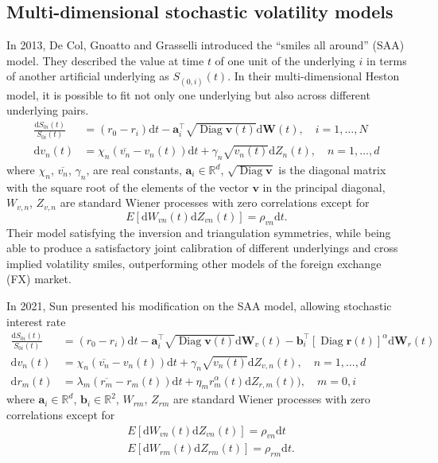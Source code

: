 \documentclass[12pt]{report}
\newcommand{\R}{\mathbb{R}}
\begin{document}
\subsection{Multi-dimensional stochastic volatility models}
In 2013, De Col, Gnoatto and Grasselli \cite{de2013smiles} introduced the ``smiles all around'' (SAA) model.
They described the value at time $t$ of one unit of the underlying $i$ in terms of another artificial underlying as $S_{(0,i)}(t)$. In their multi-dimensional Heston model, it is possible to fit not only one underlying but also across different underlying pairs.
\begin{align}
\frac{\mathrm{d} S_{0i}(t)}{S_{0i}(t)} &=\left(r_{0}-r_{i}\right) \mathrm{d}t-\mathbf{a}_{i}^{\top} \sqrt{\operatorname{Diag}\mathbf{v}(t)} \mathrm{d} \mathbf{W}(t), \quad i=1, \ldots, N \\
\mathrm{d} v_{n}(t)&=\chi_{n}\left(\overline{v_{n}}-v_{n}(t)\right) \mathrm{d} t+\gamma_{n} \sqrt{v_{n}(t)} \mathrm{d} Z_{n}(t), \quad n=1, \ldots, d
\end{align}
where $\chi_n$, $\overline{v_{n}}$, $\gamma_{n}$, are real constants, $\mathbf{a}_{i} \in \R^d$, $\sqrt{\operatorname{Diag}\mathbf{v}}$ is the diagonal matrix with the square root of the elements of the vector $\mathbf{v}$ in the principal diagonal, $W_{v,n}$, $Z_{v,n}$ are standard Wiener processes with zero correlations except for
\begin{equation}
E\left[\mathrm{d} W_{vn}(t) \mathrm{d} Z_{vn}(t)\right] =\rho_{vn} \mathrm{d} t. 
\end{equation}
Their model satisfying the inversion and triangulation symmetries, while being
able to produce a satisfactory joint calibration of different underlyings and cross
implied volatility smiles, outperforming other models of the foreign exchange (FX) market.

In 2021, Sun \cite{sun2021explicitly} presented his modification on the SAA model, allowing stochastic interest rate
\begin{align}
\frac{\mathrm{d} S_{0i}(t)}{S_{0i}(t)} &=\left(r_{0}-r_{i}\right) \mathrm{d}t-\mathbf{a}_{i}^{\top} \sqrt{\operatorname{Diag}\mathbf{v}(t)} \mathrm{d} \mathbf{W}_v(t)
-\mathbf{b}_{i}^{\top} \left[{\operatorname{Diag}\mathbf{r}(t)}\right]^\alpha \mathrm{d} \mathbf{W}_r(t) \\
\mathrm{d} v_{n}(t)&=\chi_{n}\left(\overline{v_{n}}-v_{n}(t)\right) \mathrm{d} t+\gamma_{n} \sqrt{v_{n}(t)} \mathrm{d} Z_{v,n}(t), \quad n=1, \ldots, d\\
\mathrm{d}  r_{m}(t)&=\lambda_{m}\left(\overline{r_{m}}-r_{m}(t)\right) \mathrm{d} t+\eta_{m} r_{m}^{\alpha}(t) \mathrm{d} Z_{r,m}(t)), \quad m = 0,i
\end{align}
where $\mathbf{a}_{i} \in \R^d$, $\mathbf{b}_{i} \in \R^2$, $W_{rm}$, $Z_{rm}$ are standard Wiener processes with zero correlations except for
\begin{align}
&E\left[\mathrm{d} W_{vn}(t) \mathrm{d} Z_{vn}(t)\right] =\rho_{vn} \mathrm{d} t \\
&E\left[\mathrm{d} W_{rm}(t) \mathrm{d} Z_{rm}(t)\right] =\rho_{rm} \mathrm{d} t.
\end{align}
\end{document}
